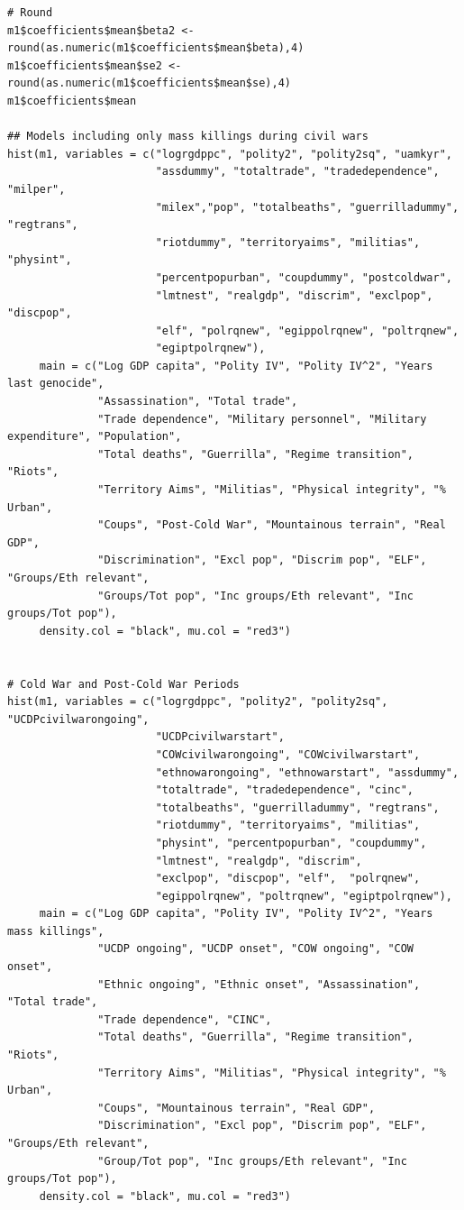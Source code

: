 \begin{verbatim}
# Round
m1$coefficients$mean$beta2 <- round(as.numeric(m1$coefficients$mean$beta),4)
m1$coefficients$mean$se2 <- round(as.numeric(m1$coefficients$mean$se),4)
m1$coefficients$mean

## Models including only mass killings during civil wars
hist(m1, variables = c("logrgdppc", "polity2", "polity2sq", "uamkyr",
                       "assdummy", "totaltrade", "tradedependence", "milper",
                       "milex","pop", "totalbeaths", "guerrilladummy", "regtrans",
                       "riotdummy", "territoryaims", "militias", "physint",
                       "percentpopurban", "coupdummy", "postcoldwar",
                       "lmtnest", "realgdp", "discrim", "exclpop", "discpop",
                       "elf", "polrqnew", "egippolrqnew", "poltrqnew",
                       "egiptpolrqnew"),
     main = c("Log GDP capita", "Polity IV", "Polity IV^2", "Years last genocide",
              "Assassination", "Total trade", 
              "Trade dependence", "Military personnel", "Military expenditure", "Population", 
              "Total deaths", "Guerrilla", "Regime transition", "Riots",
              "Territory Aims", "Militias", "Physical integrity", "% Urban",
              "Coups", "Post-Cold War", "Mountainous terrain", "Real GDP",
              "Discrimination", "Excl pop", "Discrim pop", "ELF", "Groups/Eth relevant", 
              "Groups/Tot pop", "Inc groups/Eth relevant", "Inc groups/Tot pop"),
     density.col = "black", mu.col = "red3")


# Cold War and Post-Cold War Periods
hist(m1, variables = c("logrgdppc", "polity2", "polity2sq", "UCDPcivilwarongoing",
                       "UCDPcivilwarstart",
                       "COWcivilwarongoing", "COWcivilwarstart",
                       "ethnowarongoing", "ethnowarstart", "assdummy",
                       "totaltrade", "tradedependence", "cinc",
                       "totalbeaths", "guerrilladummy", "regtrans",
                       "riotdummy", "territoryaims", "militias",
                       "physint", "percentpopurban", "coupdummy",
                       "lmtnest", "realgdp", "discrim",
                       "exclpop", "discpop", "elf",  "polrqnew",
                       "egippolrqnew", "poltrqnew", "egiptpolrqnew"),
     main = c("Log GDP capita", "Polity IV", "Polity IV^2", "Years mass killings",
              "UCDP ongoing", "UCDP onset", "COW ongoing", "COW onset", 
              "Ethnic ongoing", "Ethnic onset", "Assassination", "Total trade", 
              "Trade dependence", "CINC", 
              "Total deaths", "Guerrilla", "Regime transition", "Riots",
              "Territory Aims", "Militias", "Physical integrity", "% Urban",
              "Coups", "Mountainous terrain", "Real GDP",
              "Discrimination", "Excl pop", "Discrim pop", "ELF", "Groups/Eth relevant", 
              "Group/Tot pop", "Inc groups/Eth relevant", "Inc groups/Tot pop"),
     density.col = "black", mu.col = "red3")


\end{verbatim}
